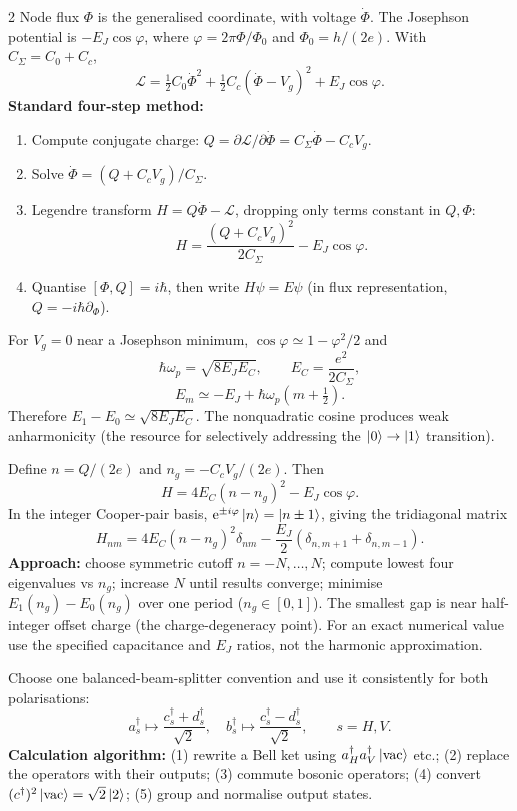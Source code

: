 \begin{multicols}{2}\small
{}
Node flux $\Phi$ is the generalised coordinate, with voltage $\dot\Phi$. The Josephson potential is $-E_J\cos\varphi$, where $\varphi=2\pi\Phi/\Phi_0$ and $\Phi_0=h/(2e)$. With $C_\Sigma=C_0+C_c$,
\[\boxed{\mathcal L=\tfrac12C_0\dot\Phi^2+\tfrac12C_c(\dot\Phi-V_g)^2+E_J\cos\varphi}.\]
\textbf{Standard four-step method:}
\begin{enumerate}
\item Compute conjugate charge: $Q=\partial\mathcal L/\partial\dot\Phi=C_\Sigma\dot\Phi-C_cV_g$.
\item Solve $\dot\Phi=(Q+C_cV_g)/C_\Sigma$.
\item Legendre transform $H=Q\dot\Phi-\mathcal L$, dropping only terms constant in $Q,\Phi$:
\[\boxed{H=\frac{(Q+C_cV_g)^2}{2C_\Sigma}-E_J\cos\varphi}.\]
\item Quantise $[\Phi,Q]=i\hbar$, then write $H\psi=E\psi$ (in flux representation, $Q=-i\hbar\partial_\Phi$).
\end{enumerate}
For $V_g=0$ near a Josephson minimum, $\cos\varphi\simeq1-\varphi^2/2$ and
\[\boxed{\hbar\omega_p=\sqrt{8E_JE_C},\qquad E_C=\frac{e^2}{2C_\Sigma}},\]\[\boxed{E_m\simeq-E_J+\hbar\omega_p\left(m+\tfrac12\right)}.\]
Therefore $E_1-E_0\simeq\sqrt{8E_JE_C}$. The nonquadratic cosine produces weak anharmonicity (the resource for selectively addressing the $\left\lvert 0\right\rangle\to\left\lvert 1\right\rangle$ transition).

Define $n=Q/(2e)$ and $n_g=-C_cV_g/(2e)$. Then
\[\boxed{H=4E_C(n-n_g)^2-E_J\cos\varphi}.\]
In the integer Cooper-pair basis, $\mathrm e^{\pm i\varphi}\left\lvert n\right\rangle=\left\lvert n\pm1\right\rangle$, giving the tridiagonal matrix
\[\boxed{H_{nm}=4E_C(n-n_g)^2\delta_{nm}-\frac{E_J}{2}(\delta_{n,m+1}+\delta_{n,m-1})}.\]
\textbf{Approach:} choose symmetric cutoff $n=-N,\dots,N$; compute lowest four eigenvalues vs $n_g$; increase $N$ until results converge; minimise $E_1(n_g)-E_0(n_g)$ over one period ($n_g\in[0,1]$). The smallest gap is near half-integer offset charge (the charge-degeneracy point). For an exact numerical value use the specified capacitance and $E_J$ ratios, not the harmonic approximation.

\columnbreak
{}
Choose one balanced-beam-splitter convention and use it consistently for both polarisations:
\[a_s^\dagger\mapsto\frac{c_s^\dagger+d_s^\dagger}{\sqrt2},\quad b_s^\dagger\mapsto\frac{c_s^\dagger-d_s^\dagger}{\sqrt2},\qquad s=H,V.\]
\textbf{Calculation algorithm:} (1) rewrite a Bell ket using $a_H^\dagger a_V^\dagger\left\lvert \mathrm{vac}\right\rangle$ etc.; (2) replace the operators with their outputs; (3) commute bosonic operators; (4) convert $(c^\dagger)^2\left\lvert \rm vac\right\rangle=\sqrt2\left\lvert 2\right\rangle$; (5) group and normalise output states.


\end{multicols}
